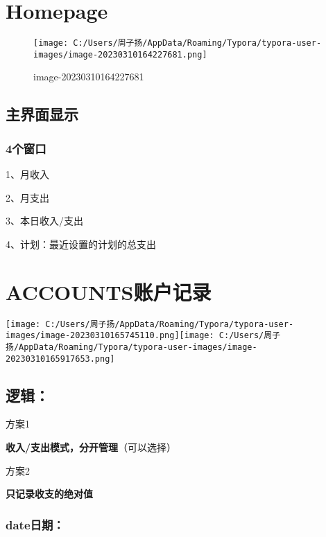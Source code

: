 \documentclass[
]{article}
\author{}
\date{}
\begin{document}
\hypertarget{homepage}{%
\section{Homepage}\label{homepage}}

\begin{figure}
\centering
\texttt{[image: C:/Users/周子扬/AppData/Roaming/Typora/typora-user-images/image-20230310164227681.png]}
\caption{image-20230310164227681}
\end{figure}

\hypertarget{ux4e3bux754cux9762ux663eux793a}{%
\subsection{主界面显示}\label{ux4e3bux754cux9762ux663eux793a}}

\hypertarget{4ux4e2aux7a97ux53e3}{%
\subsubsection{4个窗口}\label{4ux4e2aux7a97ux53e3}}

1、月收入

2、月支出

3、本日收入/支出

4、计划：最近设置的计划的总支出

\hypertarget{accountsux8d26ux6237ux8bb0ux5f55}{%
\section{ACCOUNTS账户记录}\label{accountsux8d26ux6237ux8bb0ux5f55}}

\texttt{[image: C:/Users/周子扬/AppData/Roaming/Typora/typora-user-images/image-20230310165745110.png]}\texttt{[image: C:/Users/周子扬/AppData/Roaming/Typora/typora-user-images/image-20230310165917653.png]}

\hypertarget{ux903bux8f91}{%
\subsection{逻辑：}\label{ux903bux8f91}}

方案1

\textbf{收入/支出模式，分开管理}（可以选择）

方案2

\textbf{只记录收支的绝对值}

\hypertarget{dateux65e5ux671f}{%
\subsubsection{date日期：}\label{dateux65e5ux671f}}
\end{document}
